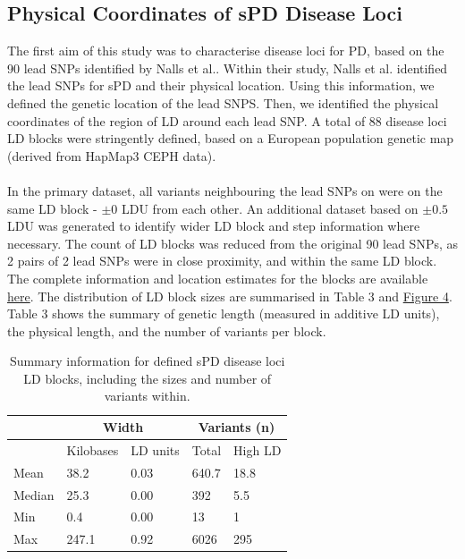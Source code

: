 \documentclass{article}
\begin{document}
\subsection{Physical Coordinates of sPD Disease Loci}
\label{subsec:blocks}
The first aim of this study was to characterise disease loci for PD, based on the 90 lead SNPs identified by Nalls et al.\cite{Nalls2019IdentificationStudies}. Within their study, Nalls et al. identified the lead SNPs for sPD and their physical location. Using this information, we defined the genetic location of the lead SNPS. Then, we identified the physical coordinates of the region of LD around each lead SNP. A total of 88 disease loci LD blocks were stringently defined, based on a European population genetic map (derived from HapMap3 CEPH data)\cite{Maniatis2004PositionalDisequilibrium.}.
\\
\\In the primary dataset, all variants neighbouring the lead SNPs on were on the same LD block - $\pm 0$ LDU from each other. An additional dataset based on $\pm 0.5$ LDU was generated to identify wider LD block and step information where necessary. The count of LD blocks was reduced from the original 90 lead SNPs, as 2 pairs of 2 lead SNPs were in close proximity, and within the same LD block. The complete information and location estimates for the blocks are available \href{https://github.com/Thomas-brightwell/PD-MSc-project-code/blob/main/Thesis/Supplementary%20materials/Supplementary%20Results%20table%20.csv}{here}. The distribution of LD block sizes are summarised in Table 3 and \hyperref[fig:blockscatter]{Figure 4}. Table 3 shows the summary of genetic length (measured in additive LD units), the physical length, and the number of variants per block.
\begin{table}[!h]
\centering
\caption{Summary information for defined sPD disease loci LD blocks, including the sizes and number of variants within.}
\label{tab:sPDblocks}
\begin{tabular}{|l|ll|ll|}
\hline
       & \multicolumn{2}{c|}{Width}                & \multicolumn{2}{c|}{Variants (n)}    \\ \hline
       & \multicolumn{1}{l|}{Kilobases} & LD units & \multicolumn{1}{l|}{Total} & High LD \\ \hline
Mean   & \multicolumn{1}{l|}{38.2}      & 0.03     & \multicolumn{1}{l|}{640.7} & 18.8    \\ \hline
Median & \multicolumn{1}{l|}{25.3}      & 0.00     & \multicolumn{1}{l|}{392}   & 5.5     \\ \hline
Min    & \multicolumn{1}{l|}{0.4}       & 0.00     & \multicolumn{1}{l|}{13}    & 1       \\ \hline
Max    & \multicolumn{1}{l|}{247.1}     & 0.92     & \multicolumn{1}{l|}{6026}  & 295     \\ \hline
\end{tabular}
\end{table}
\end{document}
